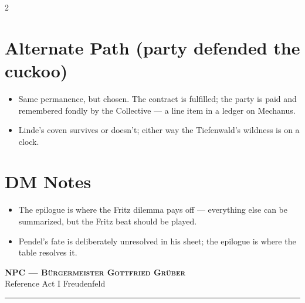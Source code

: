 \documentclass[10pt,letterpaper]{article}
\newcommand{\sceneheader}[4]{%
  \fancyhead[L]{\small\textcolor{accent}{\scshape #1}}%
  \fancyhead[R]{\small\textcolor{accent}{#2 \quad \textbullet \quad #3}}%
  \begin{center}
  {\LARGE\bfseries\scshape\textcolor{accent}{#1}}\\[2pt]
  {\small #2 \quad \textbullet \quad #3 \quad \textbullet \quad #4}\\[2pt]
  \textcolor{rulecol}{\rule{0.5\textwidth}{0.8pt}}
  \end{center}
  \vspace{-4pt}
}
\begin{document}
\begin{multicols}{2}
\section*{Alternate Path (party defended the cuckoo)}
\begin{itemize}
\item Same permanence, but chosen. The contract is fulfilled; the party is paid and remembered fondly by the Collective --- a line item in a ledger on Mechanus.
\item Linde's coven survives or doesn't; either way the Tiefenwald's wildness is on a clock.
\end{itemize}

\section*{DM Notes}
\begin{itemize}
\item The epilogue is where the Fritz dilemma pays off --- everything else can be summarized, but the Fritz beat should be played.
\item Pendel's fate is deliberately unresolved in his sheet; the epilogue is where the table resolves it.
\end{itemize}

\end{multicols}

\newpage

\label{sec:npc-gruber}\sceneheader{NPC --- Bürgermeister Gottfried Grüber}{Reference}{Act I}{Freudenfeld}
\end{document}
